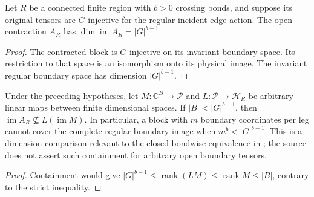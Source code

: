\begin{lemma}%
    \label{thm:peps_regular_open_boundary_dimension}
    \leanok
    Let $R$ be a connected finite region with $b>0$ crossing bonds, and suppose
    its original tensors are $G$-injective for the regular incident-edge action.
    The open contraction $A_R$ has
    $\dim\operatorname{im}A_R=|G|^{b-1}$.
\end{lemma}
\begin{proof}\leanok
    The contracted block is $G$-injective on its invariant boundary space.
    Its restriction to that space is an isomorphism onto its physical image.
    The invariant regular boundary space has dimension $|G|^{b-1}$.
\end{proof}

\begin{lemma}%
    \label{thm:peps_small_open_boundary_obstruction}
    \leanok
    Under the preceding hypotheses, let $M:\mathbb C^B\to\mathcal P$ and
    $L:\mathcal P\to\mathcal H_R$ be arbitrary linear maps between finite
    dimensional spaces. If $|B|<|G|^{b-1}$, then
    $\operatorname{im}A_R\not\subseteq L(\operatorname{im}M)$.
    In particular, a block with $m$ boundary coordinates per leg cannot
    cover the complete regular boundary image when $m^b<|G|^{b-1}$.
    This is a dimension comparison relevant to the closed bondwise equivalence
    in \cite[Section 7]{Schuch2010PEPS}; the source does not assert such
    containment for arbitrary open boundary tensors.
\end{lemma}
\begin{proof}\leanok
    Containment would give
    $|G|^{b-1}\leq\operatorname{rank}(LM)\leq\operatorname{rank}M\leq|B|$,
    contrary to the strict inequality.
\end{proof}

